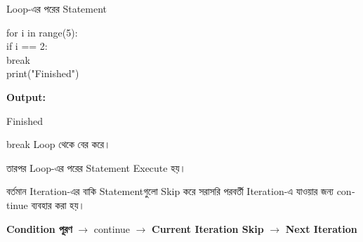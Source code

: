 \begin{codeoutputbox}{Loop-এর পরের Statement}

\noindent
\begin{minipage}[t]{0.53\linewidth}
\codeheading

\begin{english}
\ttfamily
for i in range(5):\\
\hspace*{4mm}if i == 2:\\
\hspace*{8mm}break\\[0.4mm]
print("Finished")
\end{english}

\end{minipage}
\hfill
\begin{minipage}[t]{0.43\linewidth}
\outputheading

\textbf{Output:}

\begin{center}
\textenglish{\ttfamily Finished}
\end{center}

\textenglish{\ttfamily break}
Loop থেকে বের করে।

তারপর Loop-এর পরের Statement Execute হয়।

\end{minipage}

\end{codeoutputbox}



বর্তমান Iteration-এর বাকি Statementগুলো Skip করে সরাসরি
পরবর্তী Iteration-এ যাওয়ার জন্য
\textenglish{\ttfamily continue}
ব্যবহার করা হয়।

\begin{center}

\textbf{Condition পূরণ}
\(\longrightarrow\)
\textenglish{\ttfamily continue}
\(\longrightarrow\)
\textbf{Current Iteration Skip}
\(\longrightarrow\)
\textbf{Next Iteration}

\end{center}


